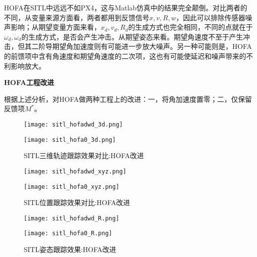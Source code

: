 HOFA在SITL中远远不如PX4，这与Matlab仿真中的结果完全颠倒。对比两者的不同，从变量来源方面看，两者都用到反馈信号$x,v,R,w$，因此可以排除传感器噪声影响；从期望变量方面来看，$x_d,v_d,R_d$的生成方式也完全相同，不同的点就在于$\omega_d,\dot \omega_d$的生成方式，是否会产生冲击。从期望姿态来看。期望角速度不至于产生冲击，但其二阶导期望角加速度则有可能进一步放大噪声。另一种可能则是，HOFA的前馈项中含有角速度和期望角速度的二次项，这也有可能使延迟和噪声带来的不利影响放大。



\textbf{HOFA工程改进}

根据上述分析，对HOFA做两种工程上的改进：一，将角加速度置零；二，仅保留反馈项$M^*$。


\begin{figure}[H]
  \centering
  \begin{minipage}[b]{0.49\linewidth}
      \texttt{[image: sitl\_hofadwd\_3d.png]}
      \caption*{$\dot \omega_d =0$}
  \end{minipage}
  \hfill %
  \begin{minipage}[b]{0.49\linewidth}
      \texttt{[image: sitl\_hofa0\_3d.png]}
      \caption*{$M^*$}
  \end{minipage}
  \caption{SITL三维轨迹跟踪效果对比:HOFA改进}
\end{figure}



  \begin{figure}[H]
    \centering
  \begin{minipage}[b]{0.49\linewidth}
      \texttt{[image: sitl\_hofadwd\_xyz.png]}
      \caption*{$\dot \omega_d =0$}
  \end{minipage}
  \hfill
  \begin{minipage}[b]{0.49\linewidth}
      \texttt{[image: sitl\_hofa0\_xyz.png]}
      \caption*{$M^*$}
  \end{minipage}
  \caption{SITL位置跟踪效果对比:HOFA改进}
\end{figure}

\begin{figure}[H]
  \centering
\begin{minipage}[b]{0.49\linewidth}
    \texttt{[image: sitl\_hofadwd\_R.png]}
    \caption*{$\dot \omega_d =0$}
\end{minipage}
\hfill
\begin{minipage}[b]{0.49\linewidth}
    \texttt{[image: sitl\_hofa0\_R.png]}
    \caption*{$M^*$}
\end{minipage}
\caption{SITL姿态跟踪效果:HOFA改进}
\end{figure}

